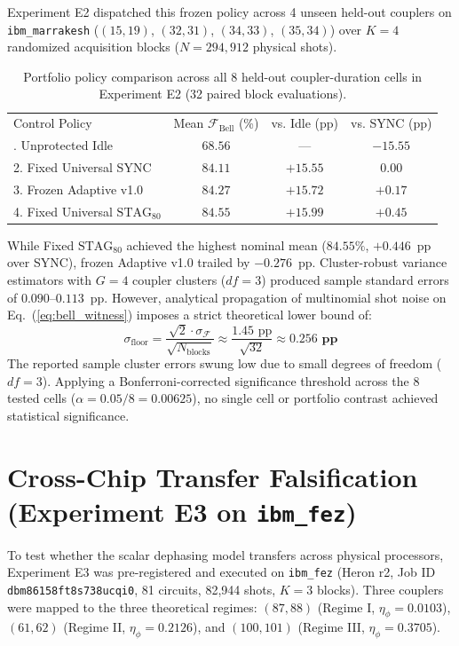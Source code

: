 \documentclass[aps,prl,twocolumn,amsmath,amssymb,superscriptaddress,floatfix]{revtex4-2}
\begin{document}
Experiment E2 dispatched this frozen policy across 4 unseen held-out couplers on \texttt{ibm\_marrakesh} ($(15, 19)$, $(32, 31)$, $(34, 33)$, $(35, 34)$) over $K = 4$ randomized acquisition blocks ($N = 294{,}912$ physical shots).

\begin{table}[h]
\caption{Portfolio policy comparison across all 8 held-out coupler-duration cells in Experiment E2 (32 paired block evaluations).}
\label{tab:e2}
\begin{ruledtabular}
\begin{tabular}{lccc}
Control Policy & Mean $\mathcal{F}_{\text{Bell}}$ (\%) & vs. Idle (pp) & vs. SYNC (pp) \\
\colrule
1. Unprotected Idle & $68.56$ & --- & $-15.55$ \\
2. Fixed Universal SYNC & $84.11$ & $+15.55$ & $0.00$ \\
3. Frozen Adaptive v1.0 & $84.27$ & $+15.72$ & $+0.17$ \\
4. Fixed Universal $\text{STAG}_{80}$ & $84.55$ & $+15.99$ & $\mathbf{+0.45}$ \\
\end{tabular}
\end{ruledtabular}
\end{table}

While Fixed $\text{STAG}_{80}$ achieved the highest nominal mean ($84.55\%$, $+0.446$~pp over SYNC), frozen Adaptive v1.0 trailed by $-0.276$~pp. Cluster-robust variance estimators with $G = 4$ coupler clusters ($df = 3$) produced sample standard errors of $0.090\text{--}0.113$~pp. However, analytical propagation of multinomial shot noise on Eq.~(\ref{eq:bell_witness}) imposes a strict theoretical lower bound of:
\begin{equation}
\sigma_{\text{floor}} = \frac{\sqrt{2} \cdot \sigma_{\mathcal{F}}}{\sqrt{N_{\text{blocks}}}} \approx \frac{1.45\text{ pp}}{\sqrt{32}} \approx \mathbf{0.256\text{ pp}}
\end{equation}
The reported sample cluster errors swung low due to small degrees of freedom ($df = 3$). Applying a Bonferroni-corrected significance threshold across the 8 tested cells ($\alpha = 0.05 / 8 = 0.00625$), no single cell or portfolio contrast achieved statistical significance.

\section{Cross-Chip Transfer Falsification (Experiment E3 on \texttt{ibm\_fez})}
To test whether the scalar dephasing model transfers across physical processors, Experiment E3 was pre-registered and executed on \texttt{ibm\_fez} (Heron r2, Job ID \texttt{dbm86158ft8s738ucqi0}, 81 circuits, 82,944 shots, $K = 3$ blocks). Three couplers were mapped to the three theoretical regimes: $(87, 88)$ (Regime I, $\eta_\phi = 0.0103$), $(61, 62)$ (Regime II, $\eta_\phi = 0.2126$), and $(100, 101)$ (Regime III, $\eta_\phi = 0.3705$).
\end{document}
